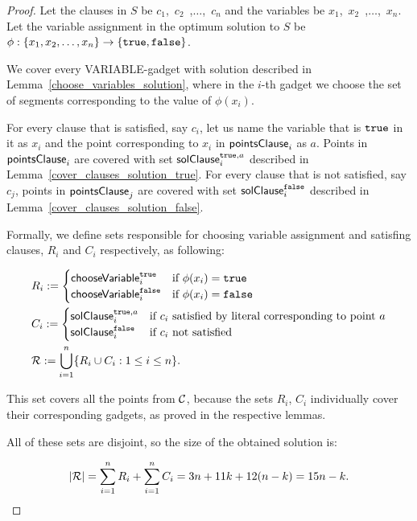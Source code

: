 \begin{proof}
Let the clauses in $S$ be $c_1$,~$c_2$~,$\ldots$,~$c_n$
and the variables be $x_1$,~$x_2$~,$\ldots$,~$x_n$.
Let the variable assignment in
the optimum solution to $S$ be
$\phi : \{ x_1, x_2, \ldots, x_n\} \rightarrow \{\texttt{true}, \texttt{false}\}$.


We cover every VARIABLE-gadget with solution described in
Lemma~\ref{choose_variables_solution}, where
in the $i$-th gadget we choose the set of segments corresponding to the
value of $\phi(x_i)$.

For every clause that is satisfied, say $c_i$, 
let us name the variable that is $\texttt{true}$ in it as $x_i$
and the point corresponding to $x_i$ in $\mathsf{pointsClause}_{i}$ as $a$.
Points in $\mathsf{pointsClause}_{i}$ 
are covered with set $\mathsf{solClause}^{\texttt{true},a}_i$ described in
Lemma~\ref{cover_clauses_solution_true}.
For every clause that is not satisfied, say $c_j$,
points in $\mathsf{pointsClause}_{j}$ are covered
with set $\mathsf{solClause}^{\texttt{false}}_i$ described in
Lemma~\ref{cover_clauses_solution_false}.

Formally, we define 
sets responsible for choosing variable assignment and satisfing clauses,
$R_i$ and $C_i$ respectively, as following:

\begin{align}
	\begin{split}
	& R_i := \begin{cases}
		\mathsf{chooseVariable}^{\texttt{true}}_{i} & \text{if}\ \phi(x_i) = \texttt{true} \\
		\mathsf{chooseVariable}^{\texttt{false}}_{i} & \text{if}\ \phi(x_i) = \texttt{false} \\
		\end{cases} \\
	& C_i := \begin{cases}
		\mathsf{solClause}^{\texttt{true},a}_i & \text{if}\ c_i \text{ satisfied by literal corresponding to point } a \\
		\mathsf{solClause}^{\texttt{false}}_i & \text{if}\ c_i \text{ not satisfied}
		\end{cases} \\
	& \mathcal{R} := \bigcup\limits_{i=1}^{n} \{R_i \cup C_i : 1 \le i \le n\}.
    \end{split}
\end{align}


This set covers all the points from $\mathcal{C}$, because
the sets $R_i$, $C_i$ individually cover their corresponding gadgets,
as proved in the respective lemmas.

All of these sets are disjoint, so the size of the obtained solution is:

$$|\mathcal{R}| = \sum_{i=1}^{n} R_i + \sum_{i=1}^n C_i = 3n + 11k + 12(n-k) = 15n - k.\qedhere$$
\end{proof}

